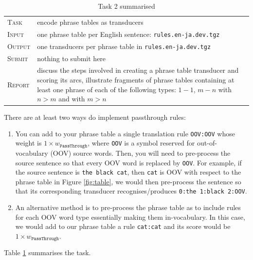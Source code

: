 \begin{table}[h]\centering
\begin{tabular}{l p{12cm}}
\textsc{Task}   &  encode phrase tables as transducers \\
\textsc{Input}  &  one phrase table per English sentence: \texttt{rules.en-ja.dev.tgz} \\
\textsc{Output} &  one transducers per phrase table in \texttt{rules.en-ja.dev.tgz} \\
\textsc{Submit} &  nothing to submit here\\
\textsc{Report} & discuss the steps involved in creating a phrase table transducer and scoring its arcs, illustrate fragments of phrase tables containing at least one phrase of each of the following types: $1-1$, $m-n$ with $n > m$ and with $m > n$\\
\end{tabular}
\caption{\label{tab:task2}Task 2 summarised}
\end{table}

There are at least two ways do implement passthrough rules:
\begin{enumerate}
	\item  You can add to your phrase table a single translation rule \texttt{OOV:OOV} whose weight is $1\times w_{\texttt{PassThrough}}$, where \texttt{OOV} is a symbol reserved for out-of-vocabulary (OOV) source words. 
Then, you will need to pre-process the source sentence so that every OOV word is replaced by \texttt{OOV}.
For example, if the source sentence is \texttt{the black cat}, then \texttt{cat} is OOV with respect to the phrase table in Figure \ref{fig:table}, we would then pre-process the sentence so that its corresponding transducer recognises/produces \texttt{0:the 1:black 2:OOV}.
\item An alternative method is to pre-process the phrase table as to include rules for each OOV word type essentially making them in-vocabulary. In this case, we would add to our phrase table a rule \texttt{cat:cat} and its score would be $1 \times w_{\texttt{PassThrough}}$. 
\end{enumerate}


Table \ref{tab:task2} summarises the task. 


